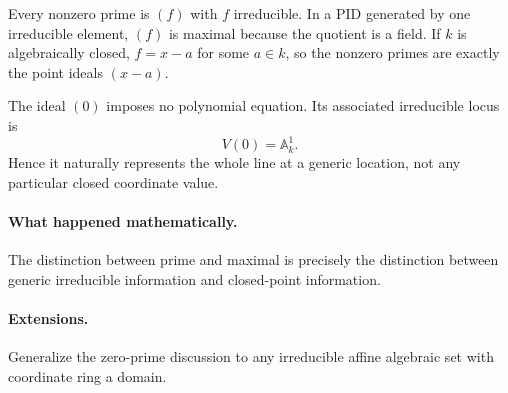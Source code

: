 Every nonzero prime is \((f)\) with \(f\) irreducible.  In a PID generated by one
irreducible element, \((f)\) is maximal because the quotient is a field.  If \(k\) is
algebraically closed, \(f=x-a\) for some \(a\in k\), so the nonzero primes are exactly the
point ideals \((x-a)\).

The ideal \((0)\) imposes no polynomial equation.  Its associated irreducible locus is
\[
V(0)=\mathbb A_k^1.
\]
Hence it naturally represents the whole line at a generic location, not any particular
closed coordinate value.

\paragraph{What happened mathematically.}
The distinction between prime and maximal is precisely the distinction between generic
irreducible information and closed-point information.

\paragraph{Extensions.}
Generalize the zero-prime discussion to any irreducible affine algebraic set with coordinate
ring a domain.
\fi
